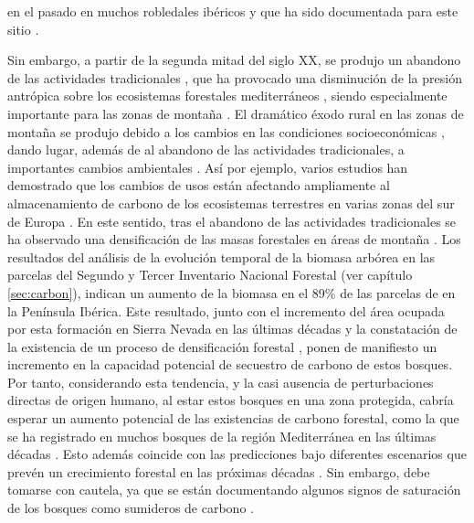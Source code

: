en el pasado en muchos robledales ibéricos \autocites{Canellasetal2004GrowthResponse,GeaIzquierdoetal2011TreeringsReflect} y que ha sido documentada para este sitio \autocites{ValbuenaCarabanaGil2013GeneticResilience}.

Sin embargo, a partir de la segunda mitad del siglo XX, se produjo un abandono de las actividades tradicionales \autocites{Piasetal2014ColonizationAbandoned,ValbuenaCarabanaetal2010HistoricalRecent,MartinezFernandezetal2015RecentLand,MacDonaldetal2000AgriculturalAbandonment}, que ha provocado una disminución de la presión antrópica sobre los ecosistemas forestales mediterráneos \autocites{ValbuenaCarabanaetal2010HistoricalRecent,PenuelasSardans2021GlobalChange}, siendo especialmente importante para las zonas de montaña \autocites{Nataleetal2007StudyTree, AlvarezMartinezetal2014InfluenceLand,JimenezOlivenciaetal2015MedioSiglo,Piasetal2014ColonizationAbandoned}. El dramático éxodo rural en las zonas de montaña se produjo debido a los cambios en las condiciones socioeconómicas \autocites{EuropeanEnvironmentAgency2010EuropeEcological}, dando lugar, además de al abandono de las actividades tradicionales, a importantes cambios ambientales \autocites{MacDonaldetal2000AgriculturalAbandonment, Nataleetal2007StudyTree, AlvarezMartinezetal2014InfluenceLand,Piussi2000ExpansionEuropean,Rutherfordetal2008AssessingLanduse,Zimmermannetal2010EffectsLanduse}. Así por ejemplo, varios estudios han demostrado que los cambios de usos están afectando ampliamente al almacenamiento de carbono de los ecosistemas terrestres en varias zonas del sur de Europa \autocite{MunozRojasetal2011ChangesLand,MunozRojasetal2015ImpactLand}. En este sentido, tras el abandono de las actividades tradicionales se ha observado una densificación de las masas forestales en áreas de montaña \autocite{JimenezOlivenciaetal2015MedioSiglo}. Los resultados del análisis de la evolución temporal de la biomasa arbórea en las parcelas del Segundo y Tercer Inventario Nacional Forestal (ver capítulo \ref{sec:carbon}), indican un aumento de la biomasa en el  89\% de las parcelas de \Qp en la Península Ibérica. Este resultado, junto con el incremento del área ocupada por esta formación en Sierra Nevada en las últimas décadas \autocite{CamachoOlmedoetal2002TransformacionPaisaje} y la constatación de la existencia de un proceso de densificación forestal \autocite{JimenezOlivenciaetal2015MedioSiglo}, ponen de manifiesto un incremento en la capacidad potencial de secuestro de carbono de estos bosques. Por tanto, considerando esta tendencia, y la casi ausencia de perturbaciones directas de origen humano, al estar estos bosques en una zona protegida, cabría esperar un aumento potencial de  las existencias de carbono forestal, como la que se ha registrado en muchos bosques de la región Mediterránea en las últimas décadas \autocite{FAOPlanBleu2018StateMediterranean}. Esto además coincide con las predicciones bajo diferentes escenarios que prevén un crecimiento forestal en las próximas décadas \autocite{Aparicioetal2015ClimateChange}. Sin embargo, debe tomarse con cautela, ya que se están documentando algunos signos de saturación de los bosques como sumideros de carbono \autocite{Nabuursetal2013FirstSigns}. 

